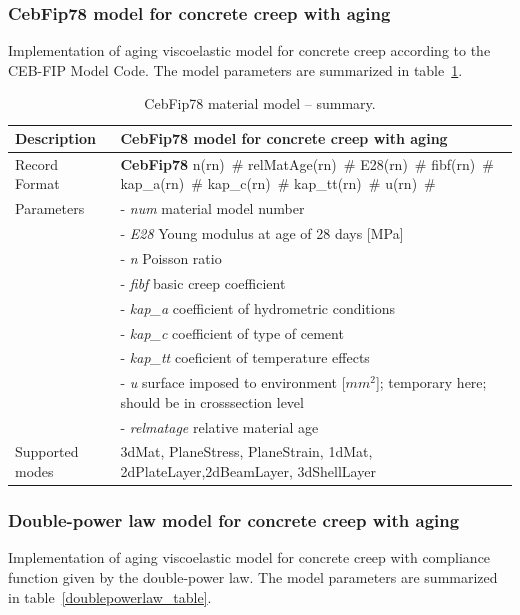 \documentclass[a4paper]{article}
\newcommand{\descitem}[1]{{\noindent \bf #1}}
\newcommand{\elemparam}[2]{{{#1\tiny (#2)}~\#}}
\newcommand{\param}[1]{{\it #1}}
\begin{document}
\subsubsection{CebFip78 model for concrete creep with aging}
Implementation of aging viscoelastic model for concrete creep
according to the CEB-FIP Model Code.
The model parameters are summarized
in table~\ref{cebfip_table}.

\begin{table}[!htb]
\begin{tabular}{|l|p{9cm}|}
\hline
Description & CebFip78 model  for concrete creep with aging\\
\hline
Record Format & \descitem{CebFip78}  \elemparam{n}{rn}
\elemparam{relMatAge}{rn} \elemparam{E28}{rn} \elemparam{fibf}{rn} \elemparam{kap\_a}{rn}
\elemparam{kap\_c}{rn} \elemparam{kap\_tt}{rn} \elemparam{u}{rn}\\
Parameters &- \param{num} material model number\\
&- \param{E28} Young modulus at age of 28 days [MPa]\\
&- \param{n} Poisson ratio\\
&- \param{fibf} basic creep coefficient\\
&- \param{kap\_a} coefficient of hydrometric conditions\\
&- \param{kap\_c} coefficient of type of cement\\
&- \param{kap\_tt} coeficient of temperature effects\\
&- \param{u} surface imposed to environment [$mm^2$]; temporary here; should be in crosssection level\\
&- \param{relmatage} relative material age \\
Supported modes& 3dMat, PlaneStress, PlaneStrain, 1dMat,
2dPlateLayer,2dBeamLayer, 3dShellLayer\\
\hline
\end{tabular}
\caption{CebFip78 material model -- summary.}
\label{cebfip_table}
\end{table}



\subsubsection{Double-power law model for concrete creep with aging}
Implementation of aging viscoelastic model for concrete creep
with compliance function given by the double-power law.
The model parameters are summarized
in table~\ref{doublepowerlaw_table}.
\end{document}

